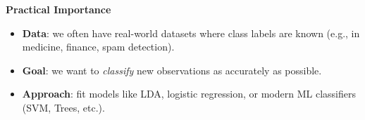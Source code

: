 \begin{flushleft}
    \textcolor{Green3}{ \textbf{Practical Importance}}
\end{flushleft}
\begin{itemize}
    \item \textbf{Data}: we often have real-world datasets where class labels are known (e.g., in medicine, finance, spam detection).
    \item \textbf{Goal}: we want to \emph{classify} new observations as accurately as possible.
    \item \textbf{Approach}: fit models like LDA, logistic regression, or modern ML classifiers (SVM, Trees, etc.).
\end{itemize}